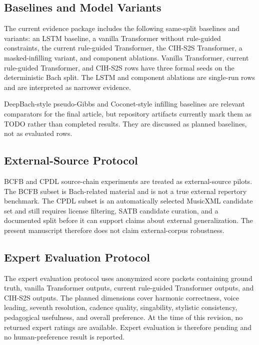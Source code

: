 \documentclass[11pt]{article}
\begin{document}
\subsection{Baselines and Model Variants}

The current evidence package includes the following same-split baselines and variants: an LSTM baseline, a vanilla Transformer without rule-guided constraints, the current rule-guided Transformer, the CIH-S2S Transformer, a masked-infilling variant, and component ablations. Vanilla Transformer, current rule-guided Transformer, and CIH-S2S rows have three formal seeds on the deterministic Bach split. The LSTM and component ablations are single-run rows and are interpreted as narrower evidence.

DeepBach-style pseudo-Gibbs and Coconet-style infilling baselines are relevant comparators for the final article, but repository artifacts currently mark them as TODO rather than completed results. They are discussed as planned baselines, not as evaluated rows.

\subsection{External-Source Protocol}

BCFB and CPDL source-chain experiments are treated as external-source pilots. The BCFB subset is Bach-related material and is not a true external repertory benchmark. The CPDL subset is an automatically selected MusicXML candidate set and still requires license filtering, SATB candidate curation, and a documented split before it can support claims about external generalization. The present manuscript therefore does not claim external-corpus robustness.

\subsection{Expert Evaluation Protocol}

The expert evaluation protocol uses anonymized score packets containing ground truth, vanilla Transformer outputs, current rule-guided Transformer outputs, and CIH-S2S outputs. The planned dimensions cover harmonic correctness, voice leading, seventh resolution, cadence quality, singability, stylistic consistency, pedagogical usefulness, and overall preference. At the time of this revision, no returned expert ratings are available. Expert evaluation is therefore pending and no human-preference result is reported.
\end{document}
